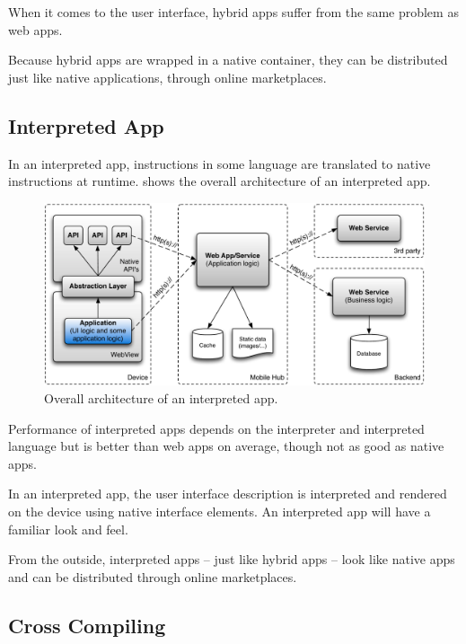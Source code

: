 When it comes to the user interface, hybrid apps suffer from the same problem as web apps. 

Because hybrid apps are wrapped in a native container, they can be distributed just like native applications, through online marketplaces. 

\subsection{Interpreted App}

In an interpreted app, instructions in some language are translated to native instructions at runtime.  shows the overall architecture of an interpreted app.

\begin{figure}[h!]
    \begin{center}
        \includegraphics[width=\textwidth]{figs/interpreted.pdf}
        \caption{
            Overall architecture of an interpreted app.
        }
        \label{fig:interpreted}
    \end{center}
\end{figure}

Performance of interpreted apps depends on the interpreter and interpreted language but is better than web apps on average, though not as good as native apps. 

In an interpreted app, the user interface description is interpreted and rendered on the device using native interface elements. An interpreted app will have a familiar look and feel.

From the outside, interpreted apps -- just like hybrid apps -- look like native apps and can be distributed through online marketplaces.

\subsection{Cross Compiling}

